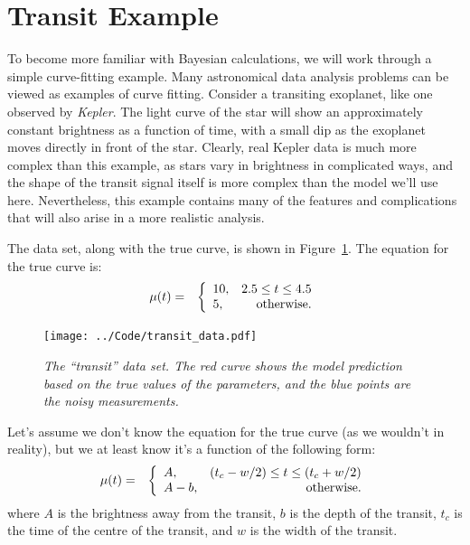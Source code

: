 \section{Transit Example}
To become more familiar with Bayesian calculations, we will work through a
simple curve-fitting example. Many astronomical data analysis problems can be
viewed as examples of curve fitting.
Consider a transiting exoplanet, like
one observed by {\it Kepler}. The light curve of the star will show an
approximately constant brightness as a function of time, with a small dip as
the exoplanet moves directly in front of the star. Clearly, real Kepler data
is much more complex than this example, as stars vary in brightness in
complicated ways, and the shape of the transit signal itself is more complex
than the model we'll use here. Nevertheless, this example contains many of the
features and complications that will also arise in a more realistic analysis.

The data set, along with the true curve, is shown in 
Figure~\ref{fig:transit_data}. The equation for the true curve is:
\begin{eqnarray*}
\mu(t) &=& \left\{
\begin{array}{lr}
10, & 2.5 \leq t \leq 4.5\\
5,  & \textnormal{otherwise}.
\end{array}
\right.
\end{eqnarray*}

\begin{figure}
\begin{center}
\texttt{[image: ../Code/transit\_data.pdf]}
\caption{\it The ``transit'' data set. The red curve shows the model prediction
based on the true values of the parameters, and the blue points are the
noisy measurements.\label{fig:transit_data}}
\end{center}
\end{figure}

Let's assume we don't know the equation for the true curve (as we wouldn't in
reality),
but we at least know it's a function of the following form:
\begin{eqnarray*}
\mu(t) &=& \left\{
\begin{array}{lr}
A, & (t_c - w/2) \leq t \leq (t_c + w/2)\\
A-b,  & \textnormal{otherwise}.
\end{array}
\right.
\end{eqnarray*}
where $A$ is the brightness away from the transit, $b$ is the depth of the
transit, $t_c$ is the time of the centre of the transit, and $w$ is the width
of the transit.

